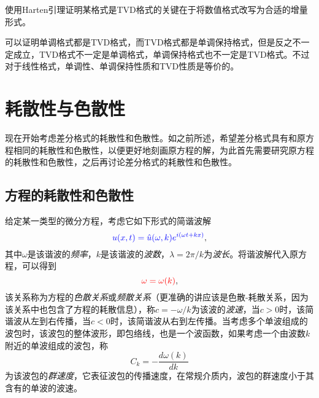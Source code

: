 \documentclass[a4paper,10pt]{ctexart}
\begin{document}
使用Harten引理证明某格式是TVD格式的关键在于将数值格式改写为合适的增量形式。

可以证明单调格式都是TVD格式，而TVD格式都是单调保持格式，但是反之不一定成立，TVD格式不一定是单调格式，单调保持格式也不一定是TVD格式。不过对于线性格式，单调性、单调保持性质和TVD性质是等价的。

\section{耗散性与色散性}
现在开始考虑差分格式的耗散性和色散性。如之前所述，希望差分格式具有和原方程相同的耗散性和色散性，以便更好地刻画原方程的解，为此首先需要研究原方程的耗散性和色散性，之后再讨论差分格式的耗散性和色散性。

\subsection{方程的耗散性和色散性}
给定某一类型的微分方程，考虑它如下形式的简谐波解
\begin{equation}
    \textcolor{blue}{u(x,t) = \hat{u}(\omega,k) e^{i(\omega t + kx)}},
\end{equation}
其中$ \omega $是该谐波的\emph{频率}，$ k $是该谐波的\emph{波数}，$ \lambda = 2\pi / k $为\emph{波长}。将谐波解代入原方程，可以得到
\begin{equation}
    \textcolor{red}{\omega = \omega(k)},
\end{equation}
该关系称为方程的\emph{色散关系}或\emph{频散关系}（更准确的讲应该是色散-耗散关系，因为该关系中也包含了方程的耗散信息），称$ c = -\omega / k $为该波的\emph{波速}，当$ c>0 $时，该简谐波从左到右传播，当$ c<0 $时，该简谐波从右到左传播。当考虑多个单波组成的波包时，该波包的整体波形，即包络线，也是一个波函数，如果考虑一个由波数$ k $附近的单波组成的波包，称
\begin{equation}
    C_k = -\frac{d \omega(k)}{dk}
\end{equation}
为该波包的\emph{群速度}，它表征波包的传播速度，在常规介质内，波包的群速度小于其含有的单波的波速。
\end{document}
